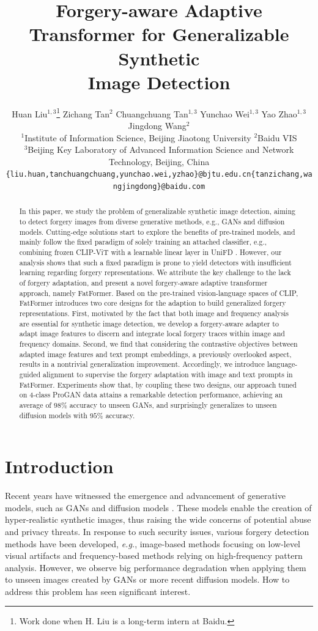 \documentclass[10pt,twocolumn,letterpaper]{article}
\title{Forgery-aware Adaptive Transformer for Generalizable Synthetic\\Image Detection}
\author{
Huan Liu$^{1,3}$\thanks{Work done when H. Liu is a long-term intern at Baidu.}\quad
Zichang Tan$^{2}$\quad
Chuangchuang Tan$^{1,3}$\quad
Yunchao Wei$^{1,3}$\quad
Yao Zhao$^{1,3}$\quad
Jingdong Wang$^2$\\[1.2mm]
$^1$Institute of Information Science, Beijing Jiaotong University \quad
$^2$Baidu VIS\\
$^3$Beijing Key Laboratory of Advanced Information Science and Network Technology, Beijing, China\\
{\tt\small \{liu.huan,tanchuangchuang,yunchao.wei,yzhao\}@bjtu.edu.cn\quad \{tanzichang,wangjingdong\}@baidu.com}
}
\begin{document}
\maketitle

\begin{abstract}
In this paper, we study the problem of generalizable synthetic image detection, aiming to detect forgery images from diverse generative methods, e.g., GANs and diffusion models. 
Cutting-edge solutions start to explore the benefits of pre-trained models, and mainly follow the fixed paradigm of solely training an attached classifier, e.g., combining frozen CLIP-ViT with a learnable linear layer in UniFD \cite{ojha2023towards}.
However, our analysis shows that such a fixed paradigm is prone to yield detectors with insufficient learning regarding forgery representations.
We attribute the key challenge to the lack of forgery adaptation, and present a novel forgery-aware adaptive transformer approach, namely FatFormer.
Based on the pre-trained vision-language spaces of CLIP, FatFormer introduces two core designs for the adaption to build generalized forgery representations.
First, motivated by the fact that both image and frequency analysis are essential for synthetic image detection, we develop a forgery-aware adapter to adapt image features to discern and integrate local forgery traces within image and frequency domains.
Second, we find that considering the contrastive objectives between adapted image features and text prompt embeddings, a previously overlooked aspect, results in a nontrivial generalization improvement.
Accordingly, we introduce language-guided alignment to supervise the forgery adaptation with image and text prompts in FatFormer.
Experiments show that, by coupling these two designs, our approach tuned on 4-class ProGAN data attains a remarkable detection performance, achieving an average of $98\%$ accuracy to unseen GANs, and surprisingly generalizes to unseen diffusion models with $95\%$ accuracy.
\end{abstract}

\section{Introduction}
\label{sec:intro}
Recent years have witnessed the emergence and advancement of generative models, such as GANs \cite{goodfellow2014generative,karras2018progressive,karras2019style,karras2020analyzing} and diffusion models \cite{ho2020denoising,gu2022vector,nichol2022glide,dhariwal2021diffusion}. These models enable the creation of hyper-realistic synthetic images, thus raising the wide concerns of potential abuse and privacy threats. In response to such security issues, various forgery detection methods \cite{durall2020watch,jeong2022frepgan,jeong2022bihpf,shiohara2022detecting,shao2023detecting} have been developed, {\em e.g.}, image-based methods \cite{wang2020cnn,chai2020makes} focusing on low-level visual artifacts and frequency-based methods \cite{frank2020leveraging,qian2020thinking} relying on high-frequency pattern analysis. However, we observe big performance degradation when applying them to unseen images created by GANs or more recent diffusion models. How to address this problem has seen significant interest.
\end{document}
